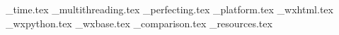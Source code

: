 \_time.tex               %
\_multithreading.tex     %
\_perfecting.tex         %
\_platform.tex           %
\_wxhtml.tex             %
\_wxpython.tex           %
\_wxbase.tex             %
\_comparison.tex         %
\_resources.tex          %


%
\setfooter{\thepage}{}{}{}{}{\thepage}%

\newpage


